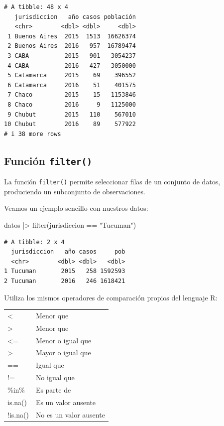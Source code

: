 \documentclass[
  spanish,
  letterpaper,
  DIV=11,
  numbers=noendperiod]{scrreprt}
\newenvironment{Shaded}{\begin{snugshade}}{\end{snugshade}}
\newcommand{\FunctionTok}[1]{\textcolor[rgb]{0.28,0.35,0.67}{#1}}
\newcommand{\NormalTok}[1]{\textcolor[rgb]{0.00,0.23,0.31}{#1}}
\newcommand{\SpecialCharTok}[1]{\textcolor[rgb]{0.37,0.37,0.37}{#1}}
\newcommand{\StringTok}[1]{\textcolor[rgb]{0.13,0.47,0.30}{#1}}
\begin{document}
\begin{verbatim}
# A tibble: 48 x 4
   jurisdiccion   año casos población
   <chr>        <dbl> <dbl>     <dbl>
 1 Buenos Aires  2015  1513  16626374
 2 Buenos Aires  2016   957  16789474
 3 CABA          2015   901   3054237
 4 CABA          2016   427   3050000
 5 Catamarca     2015    69    396552
 6 Catamarca     2016    51    401575
 7 Chaco         2015    15   1153846
 8 Chaco         2016     9   1125000
 9 Chubut        2015   110    567010
10 Chubut        2016    89    577922
# i 38 more rows
\end{verbatim}

\subsection{\texorpdfstring{Función
\texttt{filter()}}{Función filter()}}\label{funciuxf3n-filter}

La función \texttt{filter()} permite seleccionar filas de un conjunto de
datos, produciendo un subconjunto de observaciones.

Veamos un ejemplo sencillo con nuestros datos:

\begin{Shaded}
\begin{Highlighting}[]
\NormalTok{datos }\SpecialCharTok{|\textgreater{}}
  \FunctionTok{filter}\NormalTok{(jurisdiccion }\SpecialCharTok{==} \StringTok{"Tucuman"}\NormalTok{)}
\end{Highlighting}
\end{Shaded}

\begin{verbatim}
# A tibble: 2 x 4
  jurisdiccion   año casos     pob
  <chr>        <dbl> <dbl>   <dbl>
1 Tucuman       2015   258 1592593
2 Tucuman       2016   246 1618421
\end{verbatim}

Utiliza los mismos operadores de comparación propios del lenguaje R:

\begin{table}
\centering
\begin{tabular}[t]{l|l}
\hline
\cellcolor[HTML]{2f2e4e}{\textcolor{white}{Operador}} & \cellcolor[HTML]{2f2e4e}{\textcolor{white}{Descripción}}\\
\hline
< & Menor que\\
\hline
> & Menor que\\
\hline
<= & Menor o igual que\\
\hline
>= & Mayor o igual que\\
\hline
== & Igual que\\
\hline
!= & No igual que\\
\hline
\%in\% & Es parte de\\
\hline
is.na() & Es un valor ausente\\
\hline
!is.na() & No es un valor ausente\\
\hline
\end{tabular}
\end{table}
\end{document}
